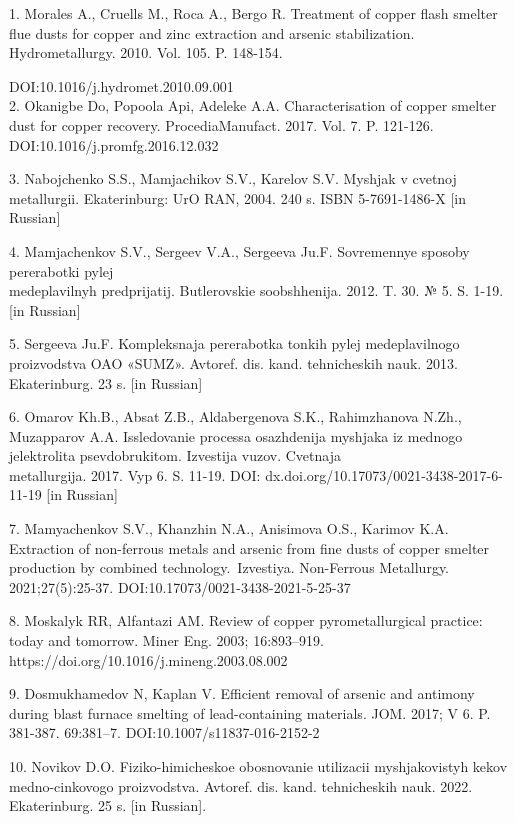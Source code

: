 \begin{noparindent}
1. Morales A., Cruells M., Roca A., Bergo R. Treatment of copper flash
smelter flue dusts for copper and zinc extraction and arsenic
stabilization. Hydrometallurgy. 2010. Vol. 105. P. 148-154.

DOI:10.1016/j.hydromet.2010.09.001\\
2. Okanigbe Do, Popoola Api, Adeleke A.A. Characterisation of copper
smelter dust for copper recovery. ProcediaManufact. 2017. Vol. 7. P.
121-126. DOI:10.1016/j.promfg.2016.12.032

3. Nabojchenko S.S., Mamjachikov S.V., Karelov S.V.
Mysh\textquotesingle jak v cvetnoj metallurgii. Ekaterinburg: UrO RAN,
2004. 240 s. ISBN 5-7691-1486-X {[}in Russian{]}

4. Mamjachenkov S.V., Sergeev V.A., Sergeeva Ju.F. Sovremennye sposoby
pererabotki pylej \\medeplavil\textquotesingle nyh predprijatij.
Butlerovskie soobshhenija. 2012. T. 30. № 5. S. 1-19. {[}in Russian{]}

5. Sergeeva Ju.F. Kompleksnaja pererabotka tonkih pylej
medeplavil\textquotesingle nogo proizvodstva OAO «SUMZ». Avtoref. dis.
kand. tehnicheskih nauk. 2013. Ekaterinburg. 23 s. {[}in Russian{]}

6. Omarov Kh.B., Absat Z.B., Aldabergenova S.K., Rahimzhanova N.Zh.,
Muzapparov A.A. Issledovanie processa osazhdenija
mysh\textquotesingle jaka iz mednogo jelektrolita psevdobrukitom.
Izvestija vuzov. Cvetnaja \\metallurgija. 2017. Vyp 6. S. 11-19. DOI:
dx.doi.org/10.17073/0021-3438-2017-6-11-19 {[}in Russian{]}

7. Mamyachenkov S.V., Khanzhin N.A., Anisimova O.S., Karimov K.A.
Extraction of non-ferrous metals and arsenic from fine dusts of copper
smelter production by combined technology.~Izvestiya. Non-Ferrous
Metallurgy. 2021;27(5):25-37. DOI:10.17073/0021-3438-2021-5-25-37

8. Moskalyk RR, Alfantazi AM. Review of copper pyrometallurgical
practice: today and tomorrow. Miner Eng. 2003; 16:893--919.
https://doi.org/10.1016/j.mineng.2003.08.002

9. Dosmukhamedov N, Kaplan V. Efficient removal of arsenic and antimony
during blast furnace smelting of lead-containing materials. JOM. 2017; V
6. P. 381-387. 69:381--7. DOI:10.1007/s11837-016-2152-2

10. Novikov D.O. Fiziko-himicheskoe obosnovanie utilizacii
mysh\textquotesingle jakovistyh kekov medno-cinkovogo proizvodstva.
Avtoref. dis. kand. tehnicheskih nauk. 2022. Ekaterinburg. 25 s. {[}in
Russian{]}.


\end{noparindent}
